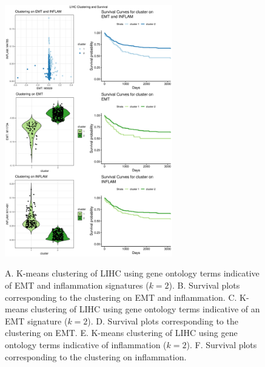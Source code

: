 \documentclass[11pt, a4paper, preprint]{article}
\begin{document}
\begin{figure}
\center
{\includegraphics[width=0.65\textwidth]{../Figs/Figure6/LIHC.pdf}}
\caption{A. K-means clustering of LIHC using gene ontology terms indicative of EMT and inflammation signatures ($k=2$).
B. Survival plots corresponding to the clustering on EMT and inflammation.
C. K-means clustering of LIHC using gene ontology terms indicative of an EMT signature ($k=2$).
D. Survival plots corresponding to the clustering on EMT.
E. K-means clustering of LIHC using gene ontology terms indicative of inflammation ($k=2$).
F. Survival plots corresponding to the clustering on inflammation.}
\label{fig:LIHC}
\end{figure}
\end{document}
